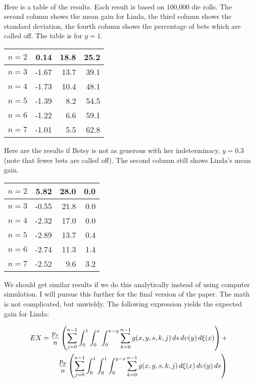 \documentclass[11pt]{article}
\begin{document}
^^^

Here is a table of the results. Each result is based on
100,000 die rolls. The second column shows the mean gain for Linda,
the third column shows the standard deviation, the fourth column shows
the percentage of bets which are called off. The table is for $y=1$.

\begin{tabular}{|l|r|r|r|}
  \hline
  $n=2$ & 0.14 & 18.8 & 25.2 \\ \hline
  $n=3$ & -1.67 & 13.7 & 39.1 \\ \hline
  $n=4$ & -1.73 & 10.4 & 48.1 \\ \hline
  $n=5$ & -1.39 & 8.2 & 54.5 \\ \hline
  $n=6$ & -1.22 & 6.6 & 59.1 \\ \hline
  $n=7$ & -1.01 & 5.5 & 62.8 \\ \hline
\end{tabular}

Here are the results if Betsy is not as generous with her
indeterminacy, $y=0.3$ (note that fewer bets are called off). The
second column still shows Linda's mean gain.

\begin{tabular}{|l|r|r|r|}
  \hline
  $n=2$ & 5.82 & 28.0 & 0.0 \\ \hline
  $n=3$ & -0.55 & 21.8 & 0.0 \\ \hline
  $n=4$ & -2.32 & 17.0 & 0.0 \\ \hline
  $n=5$ & -2.89 & 13.7 & 0.4 \\ \hline
  $n=6$ & -2.74 & 11.3 & 1.4 \\ \hline
  $n=7$ & -2.52 & 9.6 & 3.2 \\ \hline
\end{tabular}

We should get similar results if we do this analytically instead of
using computer simulation. I will pursue this further for the final
version of the paper. The math is not complicated, but unwieldy. The
following expression yields the expected gain for Linda:

\begin{eqnarray}
  \label{eq:s3}
  EX =
  \frac{p_{x}}{n}\left(\sum_{j=0}^{n-1}\int_{0}^{1}\int_{0}^{x}\int_{0}^{x-y}\sum_{k=0}^{n-1}g(x,y,s,k,j)\,ds\,d\upsilon(y)\,d\xi(x)\right)+
  \notag \\
  \frac{p_{y}}{n}\left(\sum_{j=0}^{n-1}\int_{0}^{1}\int_{0}^{1}\int_{0}^{y-s}\sum_{k=0}^{n-1}g(x,y,s,k,j)\,d\xi(x)\,d\upsilon(y)\,ds\right)
\end{eqnarray}
\end{document}
